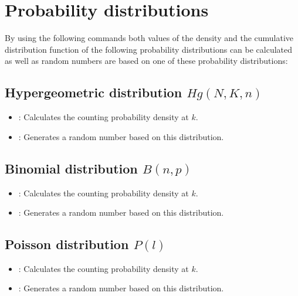 \chapter{Probability distributions}\label{sec:Wahrscheinlichkeitsverteilungen}

By using the following commands both values of the density and the cumulative distribution function
of the following probability distributions can be calculated as well as random numbers are based on
one of these probability distributions:



\section{Hypergeometric distribution \texorpdfstring{$Hg(N,K,n)$}{Hg(N,K,n)}}

\begin{itemize}

\item
{}:
Calculates the counting probability density at $k$.

\item
{}:
Generates a random number based on this distribution.

\end{itemize}



\section{Binomial distribution \texorpdfstring{$B(n,p)$}{B(n,p)}}

\begin{itemize}

\item
{}:
Calculates the counting probability density at $k$.

\item
{}:
Generates a random number based on this distribution.

\end{itemize}



\section{Poisson distribution \texorpdfstring{$P(l)$}{P(l)}}

\begin{itemize}

\item
{}:
Calculates the counting probability density at $k$.

\item
{}:
Generates a random number based on this distribution.

\end{itemize}



